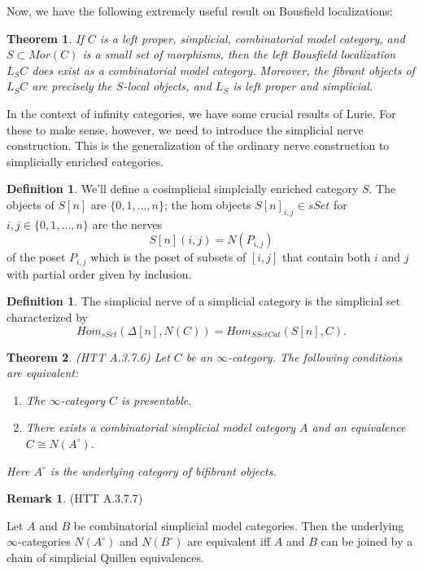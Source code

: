 \documentclass[letterpaper]{article}
\newtheorem{theorem}{Theorem}
\theoremstyle{definition}
\newtheorem{definition}[lemma]{Definition}
\newtheorem{remark}[lemma]{Remark}
\begin{document}
Now, we have the following extremely useful result on Bousfield
localizations:


\begin{theorem}
If $C$ is a left proper, simplicial, combinatorial model category, and
$S \subset Mor(C)$ is a small set of morphisms, then the left
Bousfield localization $L_SC$ does exist as a combinatorial model
category. Moreover, the fibrant objects of $L_SC$ are precisely the
$S$-local objects, and $L_S$ is left proper and simplicial.
\end{theorem}

In the context of infinity categories, we have some crucial
results of Lurie. For these to make sense, however, we need to
introduce the simplicial nerve construction. This is the
generalization of the ordinary nerve construction to simplicially
enriched categories.

\begin{definition}
We'll define a cosimplicial simplcially enriched category $S$. The
objects of $S[n]$ are $\{0,1,\dots,n\}$; the hom objects $S[n]_{i,j}
\in sSet$ for $i,j \in \{0,1,\dots,n\}$ are the nerves
\[
S[n](i,j) = N(P_{i,j})
\]
of the poset $P_{i,j}$ which is the poset of subsets of $[i,j]$ that
contain both $i$ and $j$ with partial order given by inclusion.
\end{definition}

\begin{definition}
The simplicial nerve of a simplicial category is the simplicial set
characterized by 
\[
Hom_{sSet}(\Delta[n],N(C)) = Hom_{SSetCat}(S[n],C).
\]
\end{definition}

\begin{theorem}(HTT A.3.7.6)
Let $C$ be an $\infty$-category. The following conditions are
equivalent:

\begin{enumerate}
\item The $\infty$-category $C$ is presentable.
\item There exists a combinatorial simplicial model category $A$ and
  an equivalence $C \cong N(A^\circ)$.
\end{enumerate}

Here $A^{\circ}$ is the underlying category of bifibrant objects.
\end{theorem}

\begin{remark}(HTT A.3.7.7)

Let $A$ and $B$ be combinatorial simplicial model categories. Then the
underlying $\infty$-categories $N(A^\circ)$ and $N(B^\circ)$ are
equivalent iff $A$ and $B$ can be joined by a chain of simplicial
Quillen equivalences. 
\end{remark}
\end{document}
